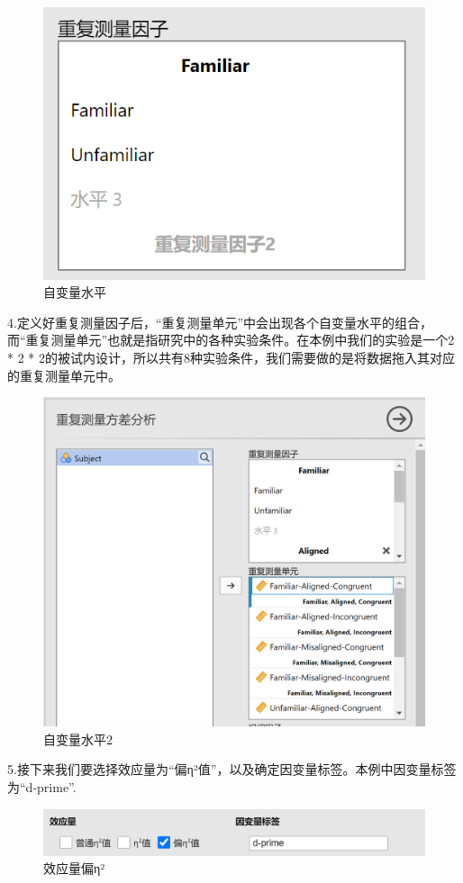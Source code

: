 \documentclass[]{ctexbook}
\theoremstyle{definition}
\theoremstyle{definition}
\theoremstyle{definition}
\theoremstyle{definition}
\theoremstyle{remark}
\begin{document}
\begin{figure}

{\centering \includegraphics[width=0.4\linewidth]{img/jamovi/rmanova-factorlevels} 

}

\caption{自变量水平}\label{fig:jamovi-rmanova-factorlevels}
\end{figure}

4.定义好重复测量因子后，``重复测量单元''中会出现各个自变量水平的组合，而``重复测量单元''也就是指研究中的各种实验条件。在本例中我们的实验是一个2 * 2 * 2的被试内设计，所以共有8种实验条件，我们需要做的是将数据拖入其对应的重复测量单元中。

\begin{figure}

{\centering \includegraphics[width=0.6\linewidth]{img/jamovi/rmanova-factorlevels2} 

}

\caption{自变量水平2}\label{fig:jamovi-rmanova-factorlevels2}
\end{figure}

5.接下来我们要选择效应量为``偏η²值''，以及确定因变量标签。本例中因变量标签为``d-prime''.

\begin{figure}

{\centering \includegraphics[width=0.6\linewidth]{img/jamovi/rmanova-dv} 

}

\caption{效应量偏η²}\label{fig:jamovi-rmanova-dv}
\end{figure}
\end{document}
